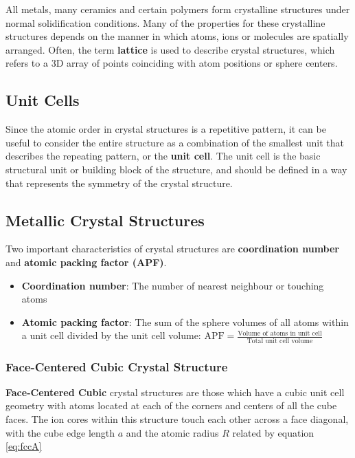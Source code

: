 \documentclass{article}
\begin{document}
All metals, many ceramics and certain polymers form crystalline structures under normal solidification conditions. Many of the properties for these crystalline structures depends on the manner in which atoms, ions or molecules are spatially arranged. Often, the term \textbf{lattice} is used to describe crystal structures, which refers to a 3D array of points coinciding with atom positions or sphere centers.

\subsection{Unit Cells}

Since the atomic order in crystal structures is a repetitive pattern, it can be useful to consider the entire structure as a combination of the smallest unit that describes the repeating pattern, or the \textbf{unit cell}. The unit cell is the basic structural unit or building block of the structure, and should be defined in a way that represents the symmetry of the crystal structure.

\subsection{Metallic Crystal Structures}

Two important characteristics of crystal structures are \textbf{coordination number} and \textbf{atomic packing factor (APF)}. 

\begin{itemize}
    \item \textbf{Coordination number}: The number of nearest neighbour or touching atoms
    \item \textbf{Atomic packing factor}: The sum of the sphere volumes of all atoms within a unit cell divided by the unit cell volume: $\text{APF} = \frac{\text{Volume of atoms in unit cell}}{\text{Total unit cell volume}}$
\end{itemize}

\subsubsection{Face-Centered Cubic Crystal Structure}

\textbf{Face-Centered Cubic} crystal structures are those which have a cubic unit cell geometry with atoms located at each of the corners and centers of all the cube faces. The ion cores within this structure touch each other across a face diagonal, with the cube edge length $a$ and the atomic radius $R$ related by equation \ref{eq:fccA}
\end{document}
